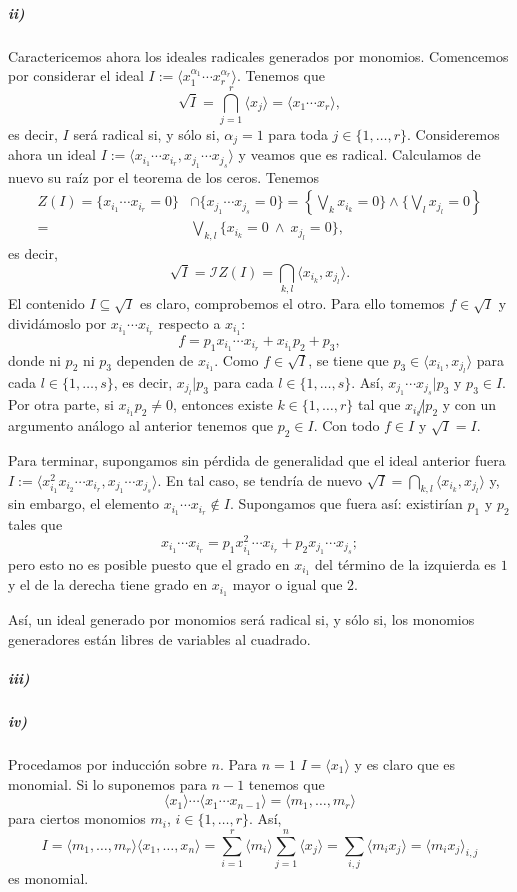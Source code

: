 \documentclass[../main.tex]{subfiles}
\begin{document}
\subparagraph{ii)} Caractericemos ahora los ideales radicales generados por monomios. Comencemos por considerar el ideal $I:=\langle x_1^{\alpha_1}\cdots x_r^{\alpha_r}\rangle.$ Tenemos que
$$\sqrt{I}=\bigcap_{j=1}^r\langle x_j\rangle=\langle x_1\cdots x_r\rangle,$$
es decir, $I$ será radical si, y sólo si, $\alpha_j=1$ para toda $j\in\{1,\dots,r\}.$ Consideremos ahora un ideal $I:=\langle x_{i_1}\cdots x_{i_r},x_{j_1}\cdots x_{j_s}\rangle$ y veamos que es radical. Calculamos de nuevo su raíz por el teorema de los ceros. Tenemos
\begin{align*}
    Z(I)=\{x_{i_1}\cdots x_{i_r}=0\}&\cap\{x_{j_1}\cdots x_{j_s}=0\}=\left\{\bigvee_{k}x_{i_k}=0\}\wedge\{\bigvee_{l} x_{j_l}=0\right\}\\
    =&\bigvee_{k,l}\{x_{i_k}=0\ \wedge\  x_{j_l}=0\},
\end{align*}
es decir,
$$\sqrt{I}=\mathcal{I}Z(I)=\bigcap_{k,l}\langle x_{i_k},x_{j_l}\rangle.$$
El contenido $I\subseteq\sqrt{I}$ es claro, comprobemos el otro. Para ello tomemos $f\in\sqrt{I}$ y dividámoslo por $x_{i_1}\cdots x_{i_r}$ respecto a $x_{i_1}$:
$$f=p_1 x_{i_1}\cdots x_{i_r} + x_{i_1}p_2+p_3,$$
donde ni $p_2$ ni $p_3$ dependen de $x_{i_1}.$ Como $f\in\sqrt{I}$, se tiene que $p_3\in\langle x_{i_1},x_{j_l}\rangle$ para cada $l\in\{1,\dots,s\}$, es decir, $x_{j_l}|p_3$ para cada $l\in\{1,\dots,s\}$. Así, $x_{j_1}\cdots x_{j_s}|p_3$ y $p_3\in I.$ Por otra parte, si $x_{i_1}p_2\neq 0$, entonces existe $k\in\{1,\dots,r\}$ tal que $x_{i_k}\not|p_2$ y con un argumento análogo al anterior tenemos que $p_2\in I$. Con todo $f\in I$ y $\sqrt{I}=I$.

Para terminar, supongamos sin pérdida de generalidad que el ideal anterior fuera $I:=\langle x_{i_1}^2x_{i_2}\cdots x_{i_r},x_{j_1}\cdots x_{j_s}\rangle$. En tal caso, se tendría de nuevo $\sqrt{I}=\bigcap_{k,l}\langle x_{i_k},x_{j_l}\rangle$ y, sin embargo, el elemento $x_{i_1}\cdots x_{i_r}\notin I$. Supongamos que fuera así: existirían $p_1$ y $p_2$ tales que
$$x_{i_1}\cdots x_{i_r}=p_1 x_{i_1}^2\cdots x_{i_r}+p_2x_{j_1}\cdots x_{j_s};$$
pero esto no es posible puesto que el grado en $x_{i_1}$ del término de la izquierda es $1$ y el de la derecha tiene grado en $x_{i_1}$ mayor o igual que $2.$

Así, un ideal generado por monomios será radical si, y sólo si, los monomios generadores están libres de variables al cuadrado.
\subparagraph{iii)} 

\subparagraph{iv)}Procedamos por inducción sobre $n.$ Para $n=1$ $I=\langle x_1\rangle$ y es claro que es monomial. Si lo suponemos para $n-1$ tenemos que
$$\langle x_1\rangle\cdots\langle x_1\cdots x_{n-1}\rangle=\langle m_1,\dots,m_r\rangle$$
para ciertos monomios $m_i$, $i\in\{1,\dots,r\}.$ Así,
$$I=\langle m_1,\dots,m_r\rangle\langle x_1,\dots,x_n\rangle=\sum_{i=1}^r\langle m_i\rangle\sum_{j=1}^{n}\langle x_j\rangle=\sum_{i,j}\langle m_i x_j\rangle=\langle m_i x_j\rangle_{i,j}$$
es monomial.
\end{document}
